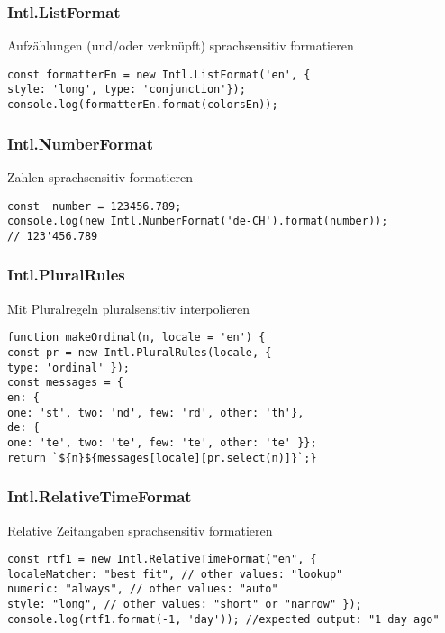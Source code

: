 \subsubsection{Intl.ListFormat}
Aufzählungen (und/oder verknüpft) sprachsensitiv formatieren
\begin{lstlisting}
const formatterEn = new Intl.ListFormat('en', {
style: 'long', type: 'conjunction'});
console.log(formatterEn.format(colorsEn));
\end{lstlisting}

\subsubsection{Intl.NumberFormat}
Zahlen sprachsensitiv formatieren
\begin{lstlisting}
const  number = 123456.789;
console.log(new Intl.NumberFormat('de-CH').format(number));
// 123'456.789
\end{lstlisting}

\subsubsection{Intl.PluralRules}
Mit Pluralregeln pluralsensitiv interpolieren
\begin{lstlisting}
function makeOrdinal(n, locale = 'en') {
const pr = new Intl.PluralRules(locale, {
type: 'ordinal' });
const messages = {
en: {
one: 'st', two: 'nd', few: 'rd', other: 'th'},
de: {
one: 'te', two: 'te', few: 'te', other: 'te' }};
return `${n}${messages[locale][pr.select(n)]}`;}
\end{lstlisting}

\subsubsection{Intl.RelativeTimeFormat}
Relative Zeitangaben sprachsensitiv formatieren
\begin{lstlisting}
const rtf1 = new Intl.RelativeTimeFormat("en", {
localeMatcher: "best fit", // other values: "lookup"
numeric: "always", // other values: "auto"
style: "long", // other values: "short" or "narrow" });
console.log(rtf1.format(-1, 'day')); //expected output: "1 day ago"
\end{lstlisting}



\vfill


\columnbreak